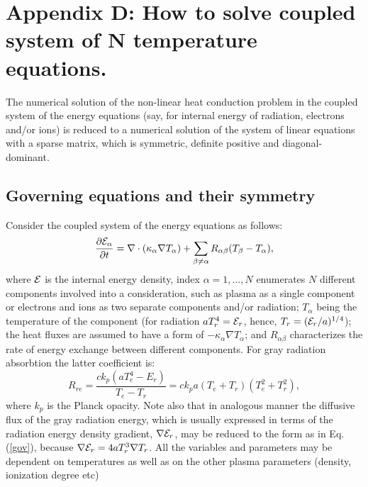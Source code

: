 %
\section{Appendix D: How to solve coupled system of N temperature equations.} 
The numerical solution of the non-linear heat conduction problem in the
coupled system of the energy equations (say, for internal energy of radiation, 
electrons and/or ions) is reduced to a numerical solution of the system of linear 
equations with a sparse matrix, which is symmetric, definite positive and 
diagonal-dominant.
\subsection{Governing equations and their symmetry}
Consider the coupled system of the energy equations as follows:
\begin{equation}\label{gov}
\frac{\partial {\cal E}_\alpha}{\partial t}=
\nabla\cdot\left(\kappa_\alpha\nabla T_\alpha\right)+
\sum_{\beta\ne\alpha}
{R_{\alpha\beta}(T_\beta-T_\alpha)},
\end{equation}
where $\cal E$ is the internal energy density, index $\alpha=1,...,N$ enumerates $N$ 
different components involved into a consideration, such as plasma as a 
single component or electrons and ions as two separate components and/or radiation; 
$T_\alpha$ being the temperature of the component (for radiation 
$aT^4_r={\cal E}_r$, hence, $T_r= ({\cal E}_r/a)^{1/4}$); the heat fluxes 
are assumed to have a form of
$-\kappa_\alpha\nabla T_\alpha$; and $R_{\alpha\beta}$ 
characterizes the rate of energy exchange between different components. For 
gray radiation absorbtion the latter coefficient is:
\begin{equation}
R_{re}=\frac{c k_p(aT_e^4-E_r)}{T_e-T_r}=c k_p a(T_e+T_r)(T_e^2+T_r^2),
\end{equation}  
where $k_p$ is the Planck opacity. Note also that in analogous manner the diffusive
flux of the gray radiation energy, which is usually expressed in terms of the radiation
energy density gradient, $\nabla{\cal E}_r$, may be reduced to the form as in 
Eq.(\ref{gov}), because $\nabla{\cal E}_r=4aT^3_r\nabla T_r$. All the variables and 
parameters
may be dependent on temperatures as well as on the other plasma parameters (density, ionization degree etc)
